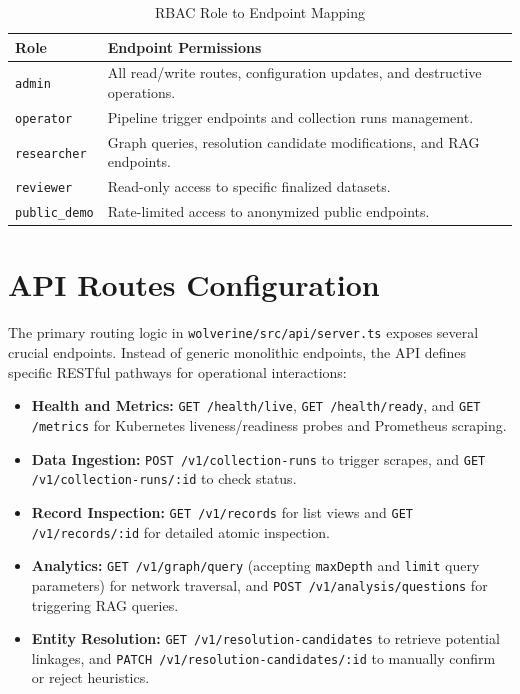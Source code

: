 \begin{table}[h]
\centering
\begin{tabular}{p{} p{}}
\toprule
\textbf{Role} & \textbf{Endpoint Permissions} \\
\midrule
\texttt{admin} & All read/write routes, configuration updates, and destructive operations. \\
\texttt{operator} & Pipeline trigger endpoints and collection runs management. \\
\texttt{researcher} & Graph queries, resolution candidate modifications, and RAG endpoints. \\
\texttt{reviewer} & Read-only access to specific finalized datasets. \\
\texttt{public\_demo} & Rate-limited access to anonymized public endpoints. \\
\bottomrule
\end{tabular}
\caption{RBAC Role to Endpoint Mapping}
\label{tab:rbac-permissions}
\end{table}

\section{API Routes Configuration}
\label{sec:impl-api-routes}
The primary routing logic in \texttt{wolverine/src/api/server.ts} exposes several crucial endpoints. Instead of generic monolithic endpoints, the API defines specific RESTful pathways for operational interactions:
\begin{itemize}
    \item \textbf{Health and Metrics:} \texttt{GET /health/live}, \texttt{GET /health/ready}, and \texttt{GET /metrics} for Kubernetes liveness/readiness probes and Prometheus scraping.
    \item \textbf{Data Ingestion:} \texttt{POST /v1/collection-runs} to trigger scrapes, and \texttt{GET /v1/collection-runs/:id} to check status.
    \item \textbf{Record Inspection:} \texttt{GET /v1/records} for list views and \texttt{GET /v1/records/:id} for detailed atomic inspection.
    \item \textbf{Analytics:} \texttt{GET /v1/graph/query} (accepting \texttt{maxDepth} and \texttt{limit} query parameters) for network traversal, and \texttt{POST /v1/analysis/questions} for triggering RAG queries.
    \item \textbf{Entity Resolution:} \texttt{GET /v1/resolution-candidates} to retrieve potential linkages, and \texttt{PATCH /v1/resolution-candidates/:id} to manually confirm or reject heuristics.
\end{itemize}

